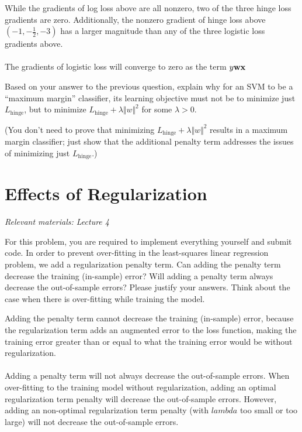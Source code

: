 While the gradients of log loss above are all nonzero, two of the three hinge loss gradients are zero. Additionally, the nonzero gradient of hinge loss above $(-1, -\frac{1}{2}, -3)$ has a larger magnitude than any of the three logistic loss gradients above.\\
\\
The gradients of logistic loss will converge to zero as the term $y \textbf{w} \textbf{x}$


\problem[5]
Based on your answer to the previous question, explain why for an SVM to be a ``maximum margin'' classifier, its learning objective must not be to minimize just $L_\text{hinge}$, but to minimize $L_\text{hinge} + \lambda\Vert w \Vert^2$ for some $\lambda > 0$.

(You don't need to prove that minimizing $L_\text{hinge} + \lambda\Vert w \Vert^2$ results in a maximum margin classifier; just show that the additional penalty term addresses the issues of minimizing just $L_\text{hinge}$.)


\newpage
\section{Effects of Regularization}
\textit{Relevant materials: Lecture  4}

For this problem, you are required to implement everything yourself and submit code.
\indent\problem[4] %
In order to prevent over-fitting in the least-squares linear regression problem, we add a regularization penalty term.
Can adding the penalty term decrease the training (in-sample) error?
Will adding a penalty term always decrease the out-of-sample errors?
Please justify your answers. Think about the case when there is over-fitting while training the model.

Adding the penalty term cannot decrease the training (in-sample) error, because the regularization term adds an augmented error to the loss function, making the training error greater than or equal to what the training error would be without regularization.\\
\\
Adding a penalty term will not always decrease the out-of-sample errors. When over-fitting to the training model without regularization, adding an optimal regularization term penalty will decrease the out-of-sample errors. However, adding an non-optimal regularization term penalty (with $lambda$ too small or too large) will not decrease the out-of-sample errors.

